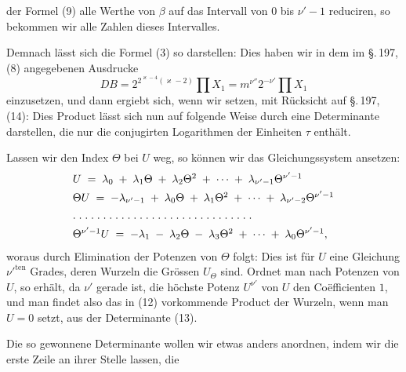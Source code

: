 
der Formel (9) alle Werthe von $\beta$ auf das Intervall von $0$ bis
$\nu' - 1$ reduciren, so bekommen wir alle Zahlen dieses Intervalles.

Demnach lässt sich die Formel (3) so darstellen:
Dies haben wir in dem im \S.\,197, (8) angegebenen Ausdrucke
\[
D B = 2^{2^{\varkappa-4}(\varkappa-2)}\prod X_1 = m^{\nu''}2^{-\nu'}\prod X_1
\]
einzusetzen, und dann ergiebt sich, wenn wir
setzen, mit Rücksicht auf \S.\,197, (14):
Dies Product lässt sich nun auf folgende Weise durch eine
Determinante darstellen, die nur die conjugirten Logarithmen
der Einheiten $\tau$ enthält.

Lassen wir den Index $\Theta$ bei $U$ weg, so können wir das
Gleichungssystem ansetzen:
\[
\begin{array}{l}
U \;=\; \lambda_0 \;+\; \lambda_1\Theta \;+\; \lambda_2\Theta^2 \;+\; \cdots \;+\; \lambda_{\nu'-1}\Theta^{\nu'-1} \\[4pt]
\Theta U \;=\; -\lambda_{\nu'-1} \;+\; \lambda_0\Theta \;+\; \lambda_1\Theta^2 \;+\; \cdots \;+\; \lambda_{\nu'-2}\Theta^{\nu'-1} \\[4pt]
\text{\normalfont .\;.\;.\;.\;.\;.\;.\;.\;.\;.\;.\;.\;.\;.\;.\;.\;.\;.\;.\;.\;.\;.\;.\;.\;.\;.\;.\;.\;.\;.} \\[4pt]
\Theta^{\nu'-1} U \;=\; -\lambda_1 \;-\; \lambda_2\Theta \;-\; \lambda_3\Theta^2 \;+\; \cdots \;+\; \lambda_0\Theta^{\nu'-1},
\end{array}
\]
woraus durch Elimination der Potenzen von $\Theta$ folgt:
Dies ist für $U$ eine Gleichung $\nu'^{\text{ten}}$ Grades, deren Wurzeln
die Grössen $U_\Theta$ sind. Ordnet man nach Potenzen von $U$, so
erhält, da $\nu'$ gerade ist, die höchste Potenz $U^{\nu'}$ von $U$ den
Co\"efficienten $1$, und man findet also das in (12) vorkommende
Product der Wurzeln, wenn man $U = 0$ setzt, aus der Determinante (13).

Die so gewonnene Determinante wollen wir etwas anders anordnen,
indem wir die erste Zeile an ihrer Stelle lassen, die
